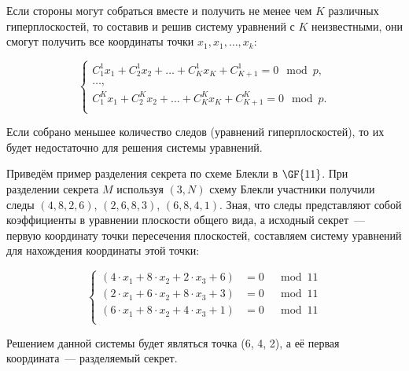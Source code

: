Если стороны могут собраться вместе и получить не менее чем $K$ различных гиперплоскостей, то составив и решив систему уравнений с $K$ неизвестными, они смогут получить все координаты точки $x_1, x_1, \dots, x_k$:

\[ \left\{ \begin{array}{l}
    C^1_1 x_1 + C^1_2 x_2 + \dots + C^1_K x_K + C^1_{K+1} = 0 \mod p, \\
    \dots, \\
    C^K_1 x_1 + C^K_2 x_2 + \dots + C^K_K x_K + C^K_{K+1} = 0 \mod p. \\
\end{array} \right. \]

Если собрано меньшее количество следов (уравнений гиперплоскостей), то их будет недостаточно для решения системы уравнений.

\example
Приведём пример разделения секрета по схеме Блекли в $\GF{11}$. При разделении секрета $M$ используя $(3,N)$ схему Блекли участники получили следы $(4, 8, 2, 6)$, $(2, 6, 8, 3)$, $(6, 8, 4, 1)$. Зная, что следы представляют собой коэффициенты в уравнении плоскости общего вида, а исходный секрет~--- первую координату точки пересечения плоскостей, составляем систему уравнений для нахождения координаты этой точки:

\[ \left\{\begin{align}
   \left( 4\cdot x_1 + 8\cdot x_2 + 2\cdot x_3 + 6 \right) &= 0 &\mod 11  \\
   \left( 2\cdot x_1 + 6\cdot x_2 + 8\cdot x_3 + 3 \right) &= 0 &\mod 11  \\
   \left( 6\cdot x_1 + 8\cdot x_2 + 4\cdot x_3 + 1 \right) &= 0 &\mod 11  \\
\end{align} \right. \]

Решением данной системы будет являться точка (6, 4, 2), а её первая координата~--- разделяемый секрет.
\exampleend

